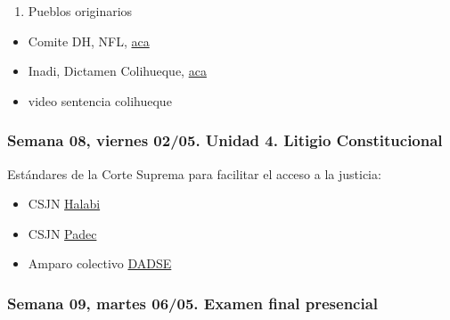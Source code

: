 \documentclass[
]{article}
\providecommand{\tightlist}{%
  \setlength{\itemsep}{0pt}\setlength{\parskip}{0pt}}
\begin{document}
\begin{enumerate}
\def\labelenumi{\alph{enumi}.}
\setcounter{enumi}{5}
\tightlist
\item
  Pueblos originarios
\end{enumerate}

\begin{itemize}
\item
  Comite DH, NFL,
  \href{https://drive.google.com/file/d/1CP_TpEaI6XXZIb3ACuyqa8XFPuvbdR3f/view?usp=sharing}{aca}
\item
  Inadi, Dictamen Colihueque,
  \href{https://drive.google.com/file/d/1_t9jnOgqHc9qw7PyU6nuJS0_VORXtdLj/view?usp=sharing¨}{aca}
\item
  video sentencia colihueque
\end{itemize}

\subsubsection{Semana 08, viernes 02/05. Unidad 4. Litigio
Constitucional}\label{semana-08-viernes-0205.-unidad-4.-litigio-constitucional}

Estándares de la Corte Suprema para facilitar el acceso a la justicia:

\begin{itemize}
\item
  CSJN
  \href{https://drive.google.com/file/d/1EcDi8VnbuUNH7DlaRPhTMit0IGLLGn0d/view?usp=sharing}{Halabi}
\item
  CSJN
  \href{https://drive.google.com/file/d/186eN_fSToqx4d_W2fRI2pckZA3a5CWCH/view?usp=sharing}{Padec}
\item
  Amparo colectivo
  \href{https://drive.google.com/file/d/1JKvY_Tlo8fV1MUStzKk_WLW_QkCFG1LG/view?usp=sharing}{DADSE}
\end{itemize}

\subsubsection{Semana 09, martes 06/05. Examen final
presencial}\label{semana-09-martes-0605.-examen-final-presencial}
\end{document}
